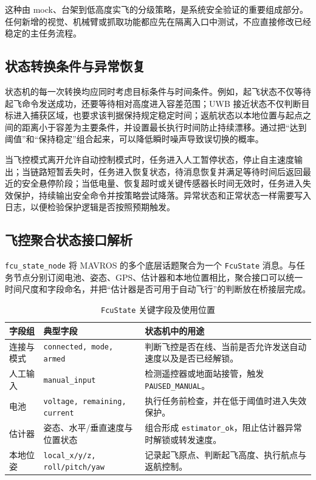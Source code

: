 \documentclass[12pt,a4paper]{ctexart}
\begin{document}
这种由 mock、台架到低高度实飞的分级策略，是系统安全验证的重要组成部分。任何新增的视觉、机械臂或抓取功能都应先在隔离入口中测试，不应直接修改已经稳定的主任务流程。

\subsection{状态转换条件与异常恢复}
状态机的每一次转换均应同时考虑目标条件与时间条件。例如，起飞状态不仅等待起飞命令发送成功，还要等待相对高度进入容差范围；UWB 接近状态不仅判断目标进入捕获区域，也要求该判据保持规定稳定时间；返航状态以本地位置与起点之间的距离小于容差为主要条件，并设置最长执行时间防止持续漂移。通过把“达到阈值”和“保持稳定”组合起来，可以降低瞬时噪声导致误切换的概率。

当飞控模式离开允许自动控制模式时，任务进入人工暂停状态，停止自主速度输出；当链路短暂丢失时，任务进入恢复状态，待消息恢复并满足等待时间后返回最近的安全悬停阶段；当低电量、恢复超时或关键传感器长时间无效时，任务进入失效保护，持续输出安全命令并按策略尝试降落。异常状态和正常状态一样需要写入日志，以便检验保护逻辑是否按照预期触发。

\subsection{飞控聚合状态接口解析}
\texttt{fcu\_state\_node} 将 MAVROS 的多个底层话题聚合为一个 \texttt{FcuState} 消息。与任务节点分别订阅电池、姿态、GPS、估计器和本地位置相比，聚合接口可以统一时间尺度和字段命名，并把“估计器是否可用于自动飞行”的判断放在桥接层完成。

\begin{table}[htbp]
\centering
\caption{\texttt{FcuState} 关键字段及使用位置}\label{tab:fcu-state}
{
\begin{tabular}{p{3.2cm}p{4.1cm}p{5.9cm}}
\hline
字段组 & 典型字段 & 状态机中的用途 \\
\hline
连接与模式 & \texttt{connected, mode, armed} & 判断飞控是否在线、当前是否允许发送自动速度以及是否已经解锁。\\
人工输入 & \texttt{manual\_input} & 检测遥控器或地面站接管，触发 \texttt{PAUSED\_MANUAL}。\\
电池 & \texttt{voltage, remaining, current} & 执行任务前检查，并在低于阈值时进入失效保护。\\
估计器 & 姿态、水平/垂直速度与位置状态 & 组合形成 \texttt{estimator\_ok}，阻止估计器异常时解锁或转发速度。\\
本地位姿 & \texttt{local\_x/y/z, roll/pitch/yaw} & 记录起飞原点、判断起飞高度、执行航点与返航控制。\\
\hline
\end{tabular}
}
\end{table}
\end{document}
